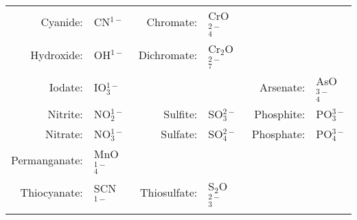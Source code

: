 \documentclass[letterpaper, 12pt]{article}
\begin{document}
\begin{center}
\begin{tabular}{r@{ }l|r@{ }l|r@{ }l}
            Cyanide:        & CN$^{1-}$             & Chromate:     & CrO$^{2-}_4$      &               &               \\
            \cline{1-2} %
            Hydroxide:      & OH$^{1-}$             & Dichromate:   & Cr$_2$O$^{2-}_7$  &               &               \\
            \cline{1-2} %
            Iodate:         & IO$^{1-}_3$           &               &                   & Arsenate:     & AsO$^{3-}_4$  \\
            \hline %
            Nitrite:        & NO$^{1-}_2$           & Sulfite:      & SO$^{2-}_3$       & Phosphite:    & PO$^{3-}_3$   \\
            Nitrate:        & NO$^{1-}_3$           & Sulfate:      & SO$^{2-}_4$       & Phosphate:    & PO$^{3-}_4$   \\
            \hline %
            Permanganate:   & MnO$^{1-}_4$          &               &                   &               &               \\
            \cline{1-4} %
            Thiocyanate:    & SCN$^{1-}$            & Thiosulfate:  & S$_2$O$^{2-}_3$   &               &               \\
            \thispagestyle{empty}
        \end{tabular}
    \end{center}
\end{document}
